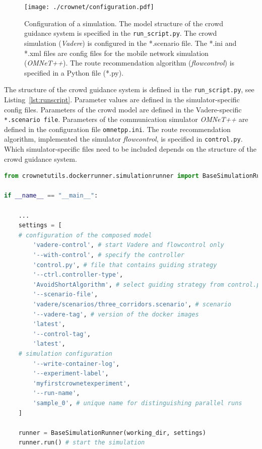 \begin{figure}[H]
\centering
\texttt{[image: ./crownet/configuration.pdf]} 
\caption[Configuration of a simulation in CrowNet]{Configuration of a simulation.  The model structure of the crowd guidance system is specified in the \lstinline{run_script.py}. The crowd simulation (\textit{Vadere}) is configured in the *.scenario file. The *.ini and *.xml files are config files for the mobile network simulation (\textit{OMNeT++}). The route recommendation algorithm (\textit{flowcontrol}) is specified in a Python file (*.py). }
\label{fig:configurationCrownet}
\end{figure}

The structure of the crowd guidance system is defined in the \lstinline{run_script.py}, see Listing~\ref{lst:runscript}. Parameter values are defined in the simulator-specific config files. Parameters of the crowd model are defined in the Vadere-specific \lstinline{*.scenario file}. Parameters of the communication simulator \textit{OMNeT++} are defined in the configuration file \lstinline{omnetpp.ini}. The route recommendation algorithm, implemented  the simulator \textit{flowcontrol}, is specified in \lstinline{control.py}.  Which simulator-specific files need to be included depends on the structure of the crowd guidance system.
 
\newpage



\begin{lstlisting}[caption={\lstinline{run_script.py}: executable and configuration file. Arguments specify the structure of the model and how the simulation is executed. Simulator-specific tags (--*-tag) ensure that research results can be reproduced. The tags correspond to a certain commit of the \textit{CrowNet} repository or use its current (`latest') version. },language=Python, label=lst:runscript]
from crownetutils.dockerrunner.simulationrunner import BaseSimulationRunner

if __name__ == "__main__":

    ...
    settings = [
    # configuration of the composed model
        'vadere-control', # start Vadere and flowcontrol only
        '--with-control', # specify the controller
        'control.py', # file that contains guiding strategy
        '--ctrl.controller-type',
        'AvoidShortAlgorithm', # select guiding strategy from control.py
        '--scenario-file',
        'vadere/scenarios/three_corridors.scenario', # scenario
        '--vadere-tag', # version of the docker images
        'latest',
        '--control-tag',
        'latest',
    # simulation configuration
        '--write-container-log',
        '--experiment-label',
        'myfirstcrownetexperiment',
        '--run-name',
        'sample_0', # unique name for distinguishing parallel runs
    ]
    
    runner = BaseSimulationRunner(working_dir, settings) 
    runner.run() # start the simulation
\end{lstlisting}

